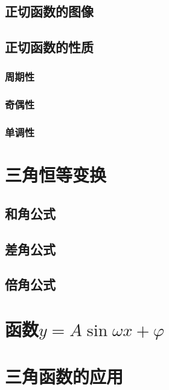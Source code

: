 \begin{conclusion}
\subsection{正切函数的图像}
\subsection{正切函数的性质}
\subsubsection{周期性}
\subsubsection{奇偶性}
\subsubsection{单调性}

\section{三角恒等变换}
\subsection{和角公式}
\subsection{差角公式}
\subsection{倍角公式}

\section{函数$y=A\sin{\omega x + \varphi}$}


\section{三角函数的应用}


\end{conclusion}
